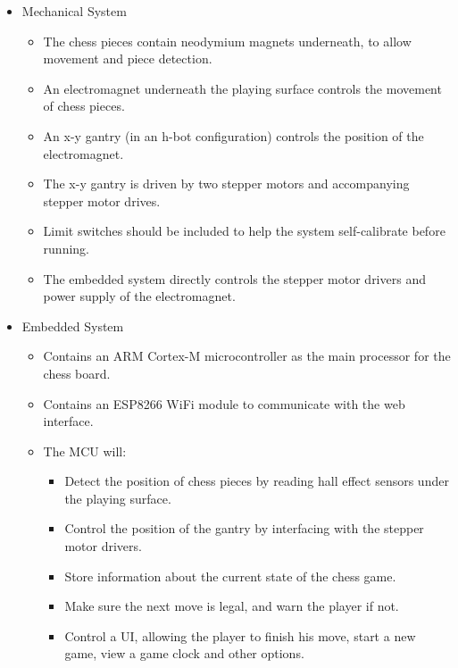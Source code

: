 \documentclass{article}
\begin{document}
\begin{itemize}
	
	\item Mechanical System

	\begin{itemize}

		\item The chess pieces contain neodymium magnets underneath, to allow movement and piece detection.
		\item An electromagnet underneath the playing surface controls the movement of chess pieces.
		\item An x-y gantry (in an h-bot configuration) controls the position of the electromagnet.
		\item The x-y gantry is driven by two stepper motors and accompanying stepper motor drives.
		\item Limit switches should be included to help the system self-calibrate before running.
		\item The embedded system directly controls the stepper motor drivers and power supply of the electromagnet.

	\end{itemize}

	\item Embedded System

	\begin{itemize}

		\item Contains an ARM Cortex-M microcontroller as the main processor for the chess board.
		\item Contains an ESP8266 WiFi module to communicate with the web interface.
		\item The MCU will:

		\begin{itemize}

			\item Detect the position of chess pieces by reading hall effect sensors under the playing surface.
			\item Control the position of the gantry by interfacing with the stepper motor drivers.
			\item Store information about the current state of the chess game.
			\item Make sure the next move is legal, and warn the player if not.
			\item Control a UI, allowing the player to finish his move, start a new game, view a game clock and other options.


\end{itemize}
\end{itemize}
\end{itemize}
\end{document}
